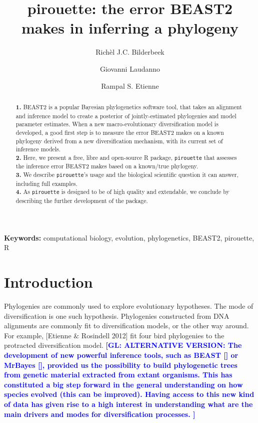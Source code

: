 \documentclass{article}
\title{pirouette: the error BEAST2 makes in inferring a phylogeny}
\author[1]{Rich\`el J.C. Bilderbeek}
\author[1]{Giovanni Laudanno}
\author[1]{Rampal S. Etienne}
\affil[1]{Groningen Institute for Evolutionary Life Sciences, University of Groningen, Groningen, The Netherlands}
\newcommand{\giovanni}[1]{\textcolor{blue}{\textbf{[GL: #1]}}}
\begin{document}
\maketitle

\begin{abstract}

  \textbf{1. }
    BEAST2 is a popular Bayesian phylogenetics software tool,
    that takes an alignment and inference model to create a
    posterior of jointly-estimated phylogenies and model parameter estimates.
    When a new macro-evolutionary diversification model is developed,
    a good first step is to measure the error BEAST2 makes on a known
    phylogeny derived from a new diversification mechanism, 
    with its current set of inference models. \\
  \textbf{2. }
    Here, we present a free, libre and open-source R package, \verb;pirouette;
    that assesses the inference error BEAST2 makes based on a known/true 
    phylogeny. \\
  \textbf{3. }
    We describe \verb;pirouette;'s usage and the biological scientific
    question it can answer, including full examples. \\
  \textbf{4. }
    As \verb;pirouette; is designed to be of high quality and extendable, 
    we conclude by describing the further development of the package. \\
\end{abstract}

{\bf Keywords:} computational biology, evolution, phylogenetics, BEAST2, pirouette, R





\section{Introduction}


Phylogenies are commonly used to explore evolutionary hypotheses.
The mode of diversification is one such hypothesis.
Phylogenies constructed from DNA alignments are commonly fit to
diversification models, or the other way around. For example,
[Etienne $\&$ Rosindell 2012] fit four bird phylogenies to the protracted
diversification model.
\giovanni{ALTERNATIVE VERSION: The development of new powerful inference tools, such as BEAST [\cite{drummond2007beast}] or MrBayes [\cite{huelsenbeck2001mrbayes}], provided us the possibility to build phylogenetic trees from genetic material extracted from extant organisms. This has constituted a big step forward in the general understanding on how species evolved (this can be improved). Having access to this new kind of data has given rise to a high interest in understanding what are the main drivers and modes for diversification processes. }
\end{document}
